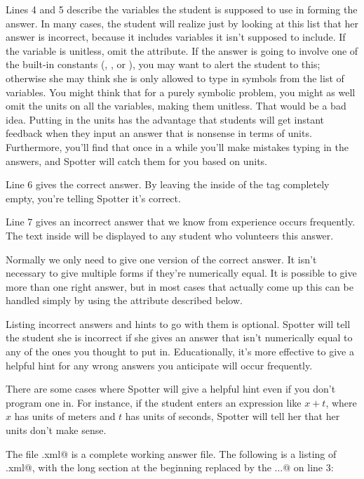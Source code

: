 \documentclass{doc}
\begin{document}
Lines 4 and 5 describe the variables the student is supposed to use in forming
the answer. In many cases, the student will realize just by looking at this list
that her answer is incorrect, because it includes variables it isn't supposed to
include. If the variable is unitless, omit the \verb@units@ attribute. If the answer
is going to involve one of the built-in constants (\verb@pi@, \verb@e@, or \verb@i@),
you may want to alert the student to this; otherwise she may think she is only
allowed to type in symbols from the list of variables. You might think that for
a purely symbolic problem, you might as well omit the units on all the variables,
making them unitless.
That would be a bad idea. Putting in the units has the advantage that students
will get instant feedback when they input an answer that is nonsense in terms of units.
Furthermore, you'll find that once in a while you'll make mistakes typing in the answers,
and Spotter will catch them for you based on units.

Line 6 gives the correct answer. By leaving the inside of the tag completely
empty, you're telling Spotter it's correct.

Line 7 gives an incorrect answer that we know from experience occurs frequently.
The text inside will be displayed to any student who volunteers this answer.

Normally we only need to give one version of the correct answer. It isn't necessary
to give multiple forms if they're numerically equal. It is possible to give more
than one right answer, but in most cases that actually come up this can be handled
simply by using the \verb@filter@ attribute described below.

Listing incorrect answers and hints to go with them is optional. Spotter will tell
the student she is incorrect if she gives an answer that isn't numerically equal
to any of the ones you thought to put in. Educationally, it's more
effective to give a helpful hint for any wrong answers you anticipate will occur
frequently.

There are some cases where Spotter will give a helpful hint even if you don't
program one in. For instance, if the student enters an expression like
$x+t$, where $x$ has units of meters and $t$ has units of seconds, Spotter
will tell her that her units don't make sense.

The file \verb@sample.xml@ is a complete working answer file. The following is a
listing of \verb@sample.xml@, with the long section at the beginning replaced
by the \verb@...@ on line 3:
\end{document}
